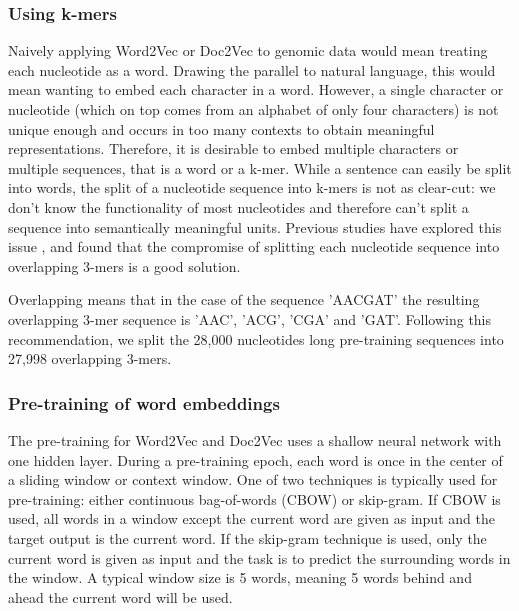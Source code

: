 \subsubsection{Using k-mers}\label{subsubsec:kmers}
Naively applying Word2Vec or Doc2Vec to genomic data would mean treating each nucleotide as a word. Drawing the parallel to natural language, this would mean wanting to embed each character in a word. However, a single character or nucleotide (which on top comes from an alphabet of only four characters) is not unique enough and occurs in too many contexts to obtain meaningful representations. Therefore, it is desirable to embed multiple characters or multiple sequences, that is a word or a k-mer. While a sentence can easily be split into words, the split of a nucleotide sequence into k-mers is not as clear-cut: we don't know the functionality of most nucleotides and therefore can't split a sequence into semantically meaningful units.
Previous studies have explored this issue \cite{kmerlength1} \cite{kmerlength2}, and found that the compromise of splitting each nucleotide sequence into overlapping 3-mers is a good solution. 

Overlapping means that in the case of the sequence 'AACGAT' the resulting overlapping 3-mer sequence is 'AAC', 'ACG', 'CGA' and 'GAT'. Following this recommendation, we split the 28,000 nucleotides long pre-training sequences into 27,998 overlapping 3-mers.
\subsubsection{Pre-training of word embeddings}
The pre-training for Word2Vec and Doc2Vec uses a shallow neural network with one hidden layer. During a pre-training epoch, each word is once in the center of a sliding window or context window. One of two techniques is typically used for pre-training: either continuous bag-of-words (CBOW) or skip-gram. If CBOW is used, all words in a window except the current word are given as input and the target output is the current word. %
If the skip-gram technique is used, only the current word is given as input and the task is to predict the surrounding words in the window. A typical window size is 5 words, meaning 5 words behind and ahead the current word will be used. 

